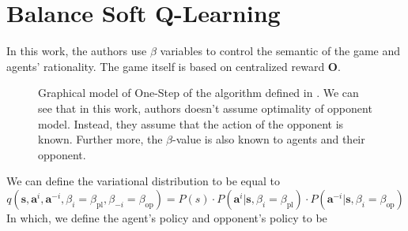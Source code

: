 \section{Balance Soft Q-Learning \cite{grau2018balancing} }
In this work, the authors use $\beta$ variables to control the semantic of the game and agents' rationality. The game itself is based on centralized reward $\boldsymbol{O}$. 
\begin{figure}[ht]
    \begin{minipage}[t]{0.5\linewidth}
    \centering
    \label{Balancing-Graphical}
    \end{minipage}%
    \begin{minipage}[t]{0.5\linewidth}
    Graphical model of One-Step of the algorithm defined in  \cite{grau2018balancing}. We can see that in this work, authors doesn't assume optimality of opponent model. Instead, they assume that the action of the opponent is known. Further more, the $\beta$-value is also known to agents and their opponent.
    \end{minipage}
\end{figure}
We can define the variational distribution to be equal to 
\begin{equation}
     q(\boldsymbol{s}, \boldsymbol{a}^i, \boldsymbol{a}^{-i}, \beta_i = \beta_{\text{pl}}, \beta_{-i} = \beta_{\text{op}}) = P(s) \cdot P(\boldsymbol{a}^i | \boldsymbol{s}, \beta_i = \beta_{\text{pl}}) \cdot P(\boldsymbol{a}^{-i} | \boldsymbol{s}, \beta_i = \beta_{\text{op}})
\end{equation}
In which, we define the agent's policy and opponent's policy to be 
